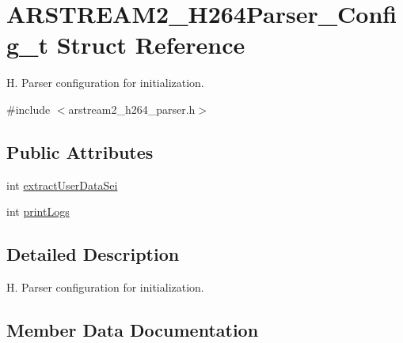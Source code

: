 \hypertarget{struct_a_r_s_t_r_e_a_m2___h264_parser___config__t}{}\section{A\+R\+S\+T\+R\+E\+A\+M2\+\_\+\+H264\+Parser\+\_\+\+Config\+\_\+t Struct Reference}
\label{struct_a_r_s_t_r_e_a_m2___h264_parser___config__t}


H. Parser configuration for initialization.  




{\ttfamily \#include $<$arstream2\+\_\+h264\+\_\+parser.\+h$>$}

\subsection*{Public Attributes}
\begin{DoxyCompactItemize}
\item 
int \hyperlink{struct_a_r_s_t_r_e_a_m2___h264_parser___config__t_ada303e0c798ed6f0ae46d37e60222be8}{extract\+User\+Data\+Sei}
\item 
int \hyperlink{struct_a_r_s_t_r_e_a_m2___h264_parser___config__t_a67c3eb3b1b0be799b57546c080b000d9}{print\+Logs}
\end{DoxyCompactItemize}


\subsection{Detailed Description}
H. Parser configuration for initialization. 

\subsection{Member Data Documentation}
